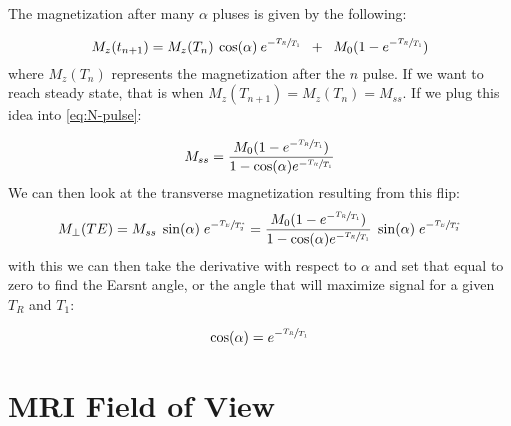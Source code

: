 The magnetization after many $\alpha$ pluses is given by the following:

\begin{equation}
M_z(t_{n+1}) = M_z(T_n) \: \cos(\alpha)\: e^{-\sfrac{T_R}{T_1}} \; \; + \; \; M_0 (1-e^{-\sfrac{T_R}{T_1}})
\label{eq:N-pulse}
\end{equation}
where $M_z(T_n)$ represents the magnetization after the $n$ pulse. If we want to reach steady state, that is when $M_z(T_{n+1})=M_z(T_n)=M_{ss}$. If we plug this idea into \ref{eq:N-pulse}:

\begin{equation}
M_{ss} = \frac{M_0 (1-e^{-\sfrac{T_R}{T_1}})}{1-\cos(\alpha)e^{-\sfrac{T_R}{T_1}}}
\end{equation}
We can then look at the transverse magnetization resulting from this flip:
\begin{equation}
M_{\perp}(TE) = M_{ss} \; \sin(\alpha)\;e^{-\sfrac{T_E}{T_2^*}}= \frac{M_0 (1-e^{-\sfrac{T_R}{T_1}})}{1-\cos(\alpha)e^{-\sfrac{T_R}{T_1}}} \; \sin(\alpha)\; e^{-\sfrac{T_E}{T_2^*}}
\end{equation}
with this we can then take the derivative with respect to $\alpha$ and set that equal to zero to find the Earsnt angle, or the angle that will maximize signal for a given $T_R$ and $T_1$:

\begin{equation}
\cos(\alpha) = e^{-\sfrac{T_R}{T_1}}
\end{equation}

\section{MRI Field of View}

